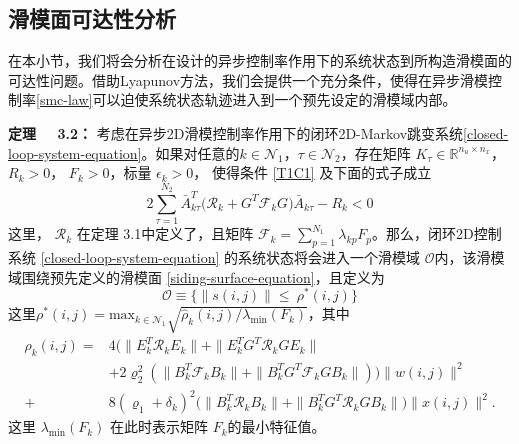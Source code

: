 \subsection{滑模面可达性分析}\label{minimization} 
	在本小节，我们将会分析在设计的异步控制率作用下的系统状态到所构造滑模面的可达性问题。借助Lyapunov方法，我们会提供一个充分条件，使得在异步滑模控制率\eqref{smc-law}可以迫使系统状态轨迹进入到一个预先设定的滑模域内部。
	
	{\bf 定理 \ \ 3.2：}
	考虑在异步2D滑模控制率作用下的闭环2D-Markov跳变系统\eqref{closed-loop-system-equation}。如果对任意的$k\in\mathcal{N}_{1}$，$\tau\in\mathcal{N}_{2}$，存在矩阵 $K_{\tau }\in\mathbb{R}^{n_u\times n_x}$， $R_{k}>0$， $F_{k}>0$，标量 $\epsilon_{k}>0$，  使得条件 \eqref{T1C1} 及下面的式子成立
	\begin{equation} \label{T2C1}
	2\sum_{\tau =1}^{N_{2}} \bar{A}^{T}_{k\tau }\big(\mathcal{R}_{k}+G^{T}\mathcal{F}_{k}G\big)\bar{A}_{k\tau }-R_{k} <0
	\end{equation}
	这里， $\mathcal{R}_{k}$ 在定理 3.1中定义了，且矩阵 $\mathcal{F}_{k}=\sum_{p=1}^{N_{1}}\lambda_{kp}F_{p}$。那么，闭环2D控制系统   \eqref{closed-loop-system-equation} 的系统状态将会进入一个滑模域 $\mathcal{O}$内，该滑模域围绕预先定义的滑模面 \eqref{siding-surface-equation}，且定义为
	\begin{equation}\label{smc-region}
	\mathcal{O}\equiv\Big\{\|s(i,j)\|\leq\ \rho^{*}(i,j) \Big\}
	\end{equation} 
	这里$\rho^{*}(i,j) = \mathrm{max}_{k\in\mathcal{N}_{1}}\sqrt{\hat{\rho}_{k}(i,j)/
		\lambda_{\mathrm{min}}(F_{k})}$，其中
	\begin{equation*}
	\begin{split}
	\hat{\rho}_{k}(i,j)=&4\big(\|E^{T}_{k}\mathcal{R}_{k}E_{k}\|+ \|E^{T}_{k}G^{T}\mathcal{R}_{k}GE_{k}\|\\
	&+2\varrho_{2}^{2}(\|B^{T}_{k}\mathcal{F}_{k}B_{k}\|+ \|B^{T}_{k}G^{T}\mathcal{F}_{k}GB_{k}\| )\big)\|w(i,j)\|^{2}\\
	+&8(\varrho_{1}+\delta_{k})^{2}\big(\|B^{T}_{k}\mathcal{R}_{k}B_{k}\|+\|B^{T}_{k}G^{T}\mathcal{R}_{k}GB_{k}\|\big)\|x(i,j)\|^{2}.
	\end{split}
	\end{equation*}
	这里 $\lambda_{\mathrm{min}}(F_{k})$ 在此时表示矩阵 $F_{k}$的最小特征值。
	
